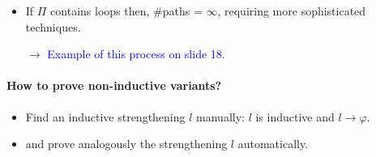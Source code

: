 \begin{itemize}
    \item If $\Pi$ contains loops then, \#paths = $\infty$, requiring more sophisticated techniques.
    \item [$\rightarrow$] \textcolor{blue}{Example of this process on slide 18.}
\end{itemize}{}

\paragraph{How to prove non-inductive variants?}
\begin{itemize}
    \item Find an inductive strengthening $l$ manually: $l$ is inductive and $l \rightarrow \varphi$.
    \item and prove analogously the strengthening $l$ automatically.
\end{itemize}{}




